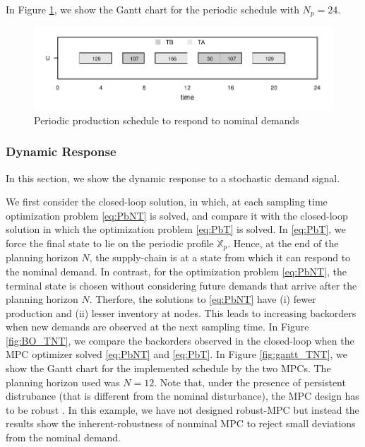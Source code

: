 \documentclass[10pt]{article}
\theoremstyle{definition}
\begin{document}
In Figure \ref{fig:gantt_ss}, we show the Gantt chart for the periodic
schedule with $N_p = 24$.

\begin{figure}
\centering
\scriptsize
\centering
\includegraphics{SS_gantt.pdf}
\caption{Periodic production schedule to respond to nominal demands}
\label{fig:gantt_ss}
\end{figure}

\subsubsection{Dynamic Response}
In this section, we show the dynamic response to a stochastic demand
signal.

We first consider the closed-loop solution, in which, at each sampling
time optimization problem \eqref{eq:PbNT} is solved, and compare it
with the closed-loop solution in which the optimization problem
\eqref{eq:PbT} is solved. In \eqref{eq:PbT}, we force the final state
to lie on the periodic profile $\mathbb{X}_p$. Hence, at the end of
the planning horizon $N$, the supply-chain is at a state from which it
can respond to the nominal demand. In contrast, for the optimization
problem \eqref{eq:PbNT}, the terminal state is chosen without
considering future demands that arrive after the planning horizon
$N$. Therfore, the solutions to \eqref{eq:PbNT} have (i) fewer
production and (ii) lesser inventory at nodes. This leads to
increasing backorders when new demands are observed at the next
sampling time. In Figure \ref{fig:BO_TNT}, we compare the backorders
observed in the closed-loop when the MPC optimizer solved
\eqref{eq:PbNT} and \eqref{eq:PbT}. In Figure \ref{fig:gantt_TNT}, we
show the Gantt chart for the implemented schedule by the two MPCs. The
planning horizon used was $N = 12$. Note that, under the presence of
persistent distrubance (that is different from the nominal
disturbance), the MPC design has to be robust
\citep[Ch 3.]{rawlings:mayne:2009}. In this example, we have not
designed robust-MPC but instead the results show the inherent-robustness of
nonminal MPC to reject small deviations from the nominal
demand. 
 
\end{document}
